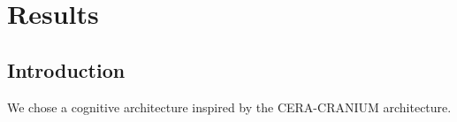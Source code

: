 \chapter{Results}

\section{Introduction}
We chose a cognitive architecture inspired by the CERA-CRANIUM architecture.

